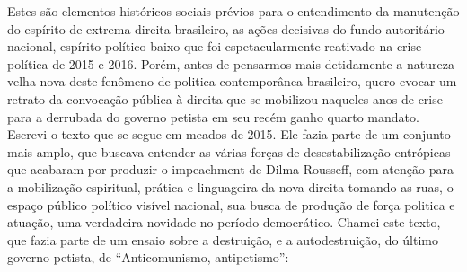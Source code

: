 Estes são elementos históricos sociais prévios para o entendimento da
manutenção do espírito de extrema direita brasileiro, as ações decisivas
do fundo autoritário nacional, espírito político baixo que foi
espetacularmente reativado na crise política de 2015 e 2016. Porém,
antes de pensarmos mais detidamente a natureza velha nova deste fenômeno
de politica contemporânea brasileiro, quero evocar um retrato da
convocação pública à direita que se mobilizou naqueles anos de crise
para a derrubada do governo petista em seu recém ganho quarto mandato.
Escrevi o texto que se segue em meados de 2015. Ele fazia parte de um
conjunto mais amplo, que buscava entender as várias forças de
desestabilização entrópicas que acabaram por produzir o impeachment de
Dilma Rousseff, com atenção para a mobilização espiritual, prática e
linguageira da nova direita tomando as ruas, o espaço público político
visível nacional, sua busca de produção de força politica e atuação, uma
verdadeira novidade no período democrático. Chamei este texto, que fazia
parte de um ensaio sobre a destruição, e a autodestruição, do último
governo petista, de ``Anticomunismo, antipetismo'':

